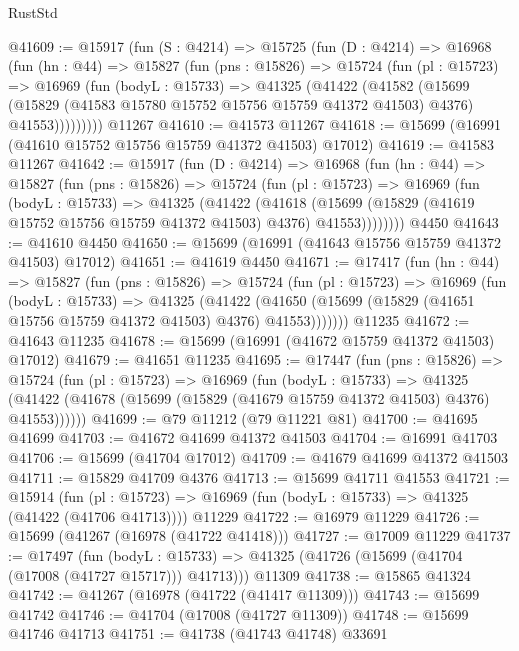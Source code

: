 \begin{lexlean}{RustStd}
\begin{coremodule}
@41609 := @15917
    (fun (S : @4214) =>
    @15725
      (fun (D : @4214) =>
      @16968
        (fun (hn : @44) =>
        @15827
          (fun (pns : @15826) =>
          @15724
            (fun (pl : @15723) =>
            @16969
              (fun (bodyL : @15733) =>
              @41325
                (@41422
                  (@41582
                    (@15699
                      (@15829 (@41583 @15780 @15752 @15756 @15759 @41372 @41503) @4376)
                      @41553)))))))))
    @11267
@41610 := @41573 @11267
@41618 := @15699 (@16991 (@41610 @15752 @15756 @15759 @41372 @41503) @17012)
@41619 := @41583 @11267
@41642 := @15917
    (fun (D : @4214) =>
    @16968
      (fun (hn : @44) =>
      @15827
        (fun (pns : @15826) =>
        @15724
          (fun (pl : @15723) =>
          @16969
            (fun (bodyL : @15733) =>
            @41325
              (@41422
                (@41618
                  (@15699 (@15829 (@41619 @15752 @15756 @15759 @41372 @41503) @4376) @41553))))))))
    @4450
@41643 := @41610 @4450
@41650 := @15699 (@16991 (@41643 @15756 @15759 @41372 @41503) @17012)
@41651 := @41619 @4450
@41671 := @17417
    (fun (hn : @44) =>
    @15827
      (fun (pns : @15826) =>
      @15724
        (fun (pl : @15723) =>
        @16969
          (fun (bodyL : @15733) =>
          @41325
            (@41422
              (@41650 (@15699 (@15829 (@41651 @15756 @15759 @41372 @41503) @4376) @41553)))))))
    @11235
@41672 := @41643 @11235
@41678 := @15699 (@16991 (@41672 @15759 @41372 @41503) @17012)
@41679 := @41651 @11235
@41695 := @17447
    (fun (pns : @15826) =>
    @15724
      (fun (pl : @15723) =>
      @16969
        (fun (bodyL : @15733) =>
        @41325 (@41422 (@41678 (@15699 (@15829 (@41679 @15759 @41372 @41503) @4376) @41553))))))
@41699 := @79 @11212 (@79 @11221 @81)
@41700 := @41695 @41699
@41703 := @41672 @41699 @41372 @41503
@41704 := @16991 @41703
@41706 := @15699 (@41704 @17012)
@41709 := @41679 @41699 @41372 @41503
@41711 := @15829 @41709 @4376
@41713 := @15699 @41711 @41553
@41721 := @15914
    (fun (pl : @15723) => @16969 (fun (bodyL : @15733) => @41325 (@41422 (@41706 @41713))))
    @11229
@41722 := @16979 @11229
@41726 := @15699 (@41267 (@16978 (@41722 @41418)))
@41727 := @17009 @11229
@41737 := @17497
    (fun (bodyL : @15733) => @41325 (@41726 (@15699 (@41704 (@17008 (@41727 @15717))) @41713)))
    @11309
@41738 := @15865 @41324
@41742 := @41267 (@16978 (@41722 (@41417 @11309)))
@41743 := @15699 @41742
@41746 := @41704 (@17008 (@41727 @11309))
@41748 := @15699 @41746 @41713
@41751 := @41738 (@41743 @41748) @33691

\end{coremodule}
\end{lexlean}
